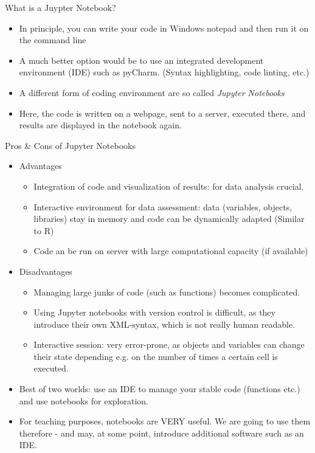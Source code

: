 \begin{frame}{What is a Juypter Notebook?}
	
	\begin{itemize}
		\item In principle, you can write your code in Windows notepad and then run it on the command line
		\item A much better option would be to use an integrated development environment (IDE) such as pyCharm. (Syntax highlighting, code linting, etc.)
		\item A different form of coding environment are so called \textit{Jupyter Notebooks}
		\item Here, the code is written on a webpage, sent to a server, executed there, and results are displayed in the notebook again.
	
	\end{itemize}	
	
	
\end{frame}

\begin{frame}{Pros \& Cons of Jupyter Notebooks}

\begin{itemize}
		\item Advantages
	\begin{itemize}
		\item Integration of code and visualization of results: for data analysis crucial. 
		\item Interactive environment for data assessment: data (variables, objects, libraries) stay in memory and code can be dynamically adapted (Similar to R)
		\item Code an be run on server with large computational capacity (if available)
				
	\end{itemize}
	\item Disadvantages
	\begin{itemize}
		\item Managing large junks of code (such as functions) becomes complicated. 
		\item Using Jupyter notebooks with version control is difficult, as they introduce their own XML-syntax, which is not really human readable. 
		\item Interactive session: very error-prone, as objects and variables can change their state depending e.g. on the number of times a certain cell is executed.		
	\end{itemize}

	\item Best of two worlds: use an IDE to manage your stable code (functions etc.) and use notebooks for exploration.
	\item For teaching purposes, notebooks are VERY useful. We are going to use them therefore - and may, at some point, introduce additional software such as an IDE.
\end{itemize}	
	
\end{frame}

